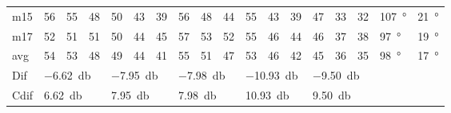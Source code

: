 \begin{table}[H]
\begin{tabular}{l|l|l|l|l|l|l|l|l|l|l|l|l|l|l|l|l|l}
m15  &  56    &  55    &  48    &   50   &   43   &   39   &   56   &  48     & 44     &    55   &   43   &   39   & 47 & 33 & 32 & \SI{107}{\degree} &  \SI{21}{\degree}  \\
m17  & 52     &  51    &  51    &  50    &  44    &    45  &   57   &   53    &  52    &  55     &  46    &   44   & 46 & 37 &  38 & \SI{97}{\degree} & \SI{19}{\degree}   \\ \hline
avg &  54    & 53     &  48    &  49    &  44    &  41    &  55    &   51    &  47    &   53    &   46   &  42    & 45 & 36  & 35 & \SI{98}{\degree} & \SI{17}{\degree}  \\ \hline  
Dif & \multicolumn{3}{l|}{\SI{-6.62}{\decibel}} & \multicolumn{3}{l|}{\SI{-7.95}{\decibel}} & \multicolumn{3}{l|}{\SI{-7.98}{\decibel}} & \multicolumn{3}{l|}{\SI{-10.93}{\decibel}} & \multicolumn{3}{l|}{\SI{-9.50}{\decibel}}      &     \multicolumn{2}{l}{} \\\hline 
Cdif & \multicolumn{3}{l|}{\SI{6.62}{\decibel}} & \multicolumn{3}{l|}{\SI{7.95}{\decibel}} & \multicolumn{3}{l|}{\SI{7.98}{\decibel}} & \multicolumn{3}{l|}{\SI{10.93}{\decibel}} & \multicolumn{3}{l|}{\SI{9.50}{\decibel}}  &   \multicolumn{2}{l}{}                
\end{tabular}
\label{meas:result_cross_5_6}
\end{table}


